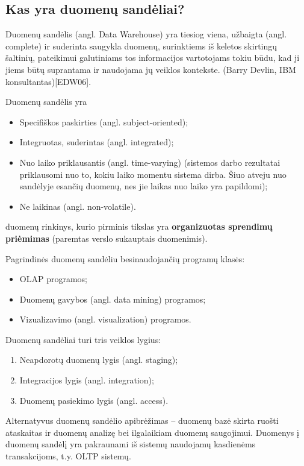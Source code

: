\documentclass[12pt,a4paper,titlepage]{article}
\begin{document}

\subsection{Kas yra duomenų sandėliai?}

Duomenų sandėlis (angl. Data Warehouse) yra tiesiog viena, užbaigta (angl. complete) ir suderinta saugykla duomenų, surinktiems iš keletos skirtingų šaltinių, pateikimui galutiniams tos informacijos vartotojams tokiu būdu, kad ji jiems būtų suprantama ir naudojama jų veiklos kontekste. (Barry Devlin, IBM konsultantas)[EDW06].

Duomenų sandėlis yra
\begin{itemize}
  \item Specifiškos paskirties (angl. subject-oriented);
  \item Integruotas, suderintas (angl. integrated);
  \item Nuo laiko priklausantis (angl. time-varying) (sistemos darbo rezultatai priklausomi nuo to, kokiu laiko momentu sistema dirba. Šiuo atveju nuo sandėlyje esančių duomenų, nes jie laikas nuo laiko yra papildomi);
  \item Ne laikinas (angl. non-volatile).
\end{itemize}
duomenų rinkinys, kurio pirminis tikslas yra \textbf{organizuotas sprendimų priėmimas} (paremtas verslo sukauptais duomenimis).

Pagrindinės duomenų sandėliu besinaudojančių programų klasės:
\begin{itemize}
  \item OLAP programos;
  \item Duomenų gavybos (angl. data mining) programos;
  \item Vizualizavimo (angl. visualization) programos.
\end{itemize}

Duomenų sandėliai turi tris veiklos lygius:
\begin{enumerate}
  \item Neapdorotų duomenų lygis (angl. staging);
  \item Integracijos lygis (angl. integration);
  \item Duomenų pasiekimo lygis (angl. access).
\end{enumerate}

Alternatyvus duomenų sandėlio apibrėžimas – duomenų bazė skirta ruošti ataskaitas ir duomenų analizę bei ilgalaikiam duomenų saugojimui. Duomenys į duomenų sandėlį yra pakraunami iš sistemų naudojamų kasdienėms transakcijoms, t.y. OLTP sistemų. 
\end{document}
